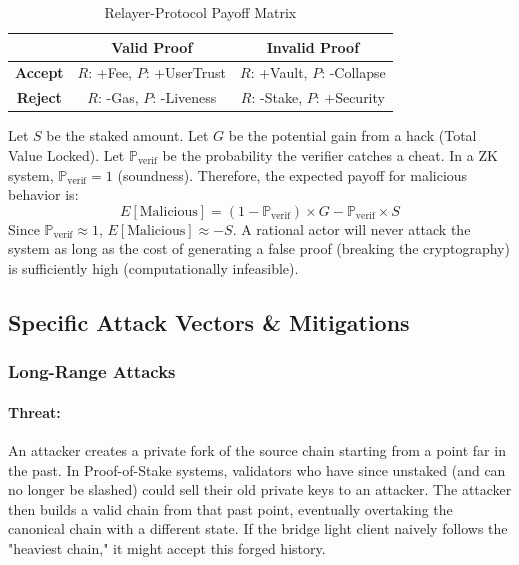 \documentclass[11pt,a4paper]{article}
\begin{document}
\begin{table}[H]
\centering
\begin{tabular}{c|c|c}
 & \textbf{Valid Proof} & \textbf{Invalid Proof} \\ \hline
\textbf{Accept} & $R$: +Fee, $P$: +UserTrust & $R$: +Vault, $P$: -Collapse \\ \hline
\textbf{Reject} & $R$: -Gas, $P$: -Liveness & $R$: -Stake, $P$: +Security \\ \hline
\end{tabular}
\caption{Relayer-Protocol Payoff Matrix}
\end{table}

Let $S$ be the staked amount. Let $G$ be the potential gain from a hack (Total Value Locked). Let $\mathbb{P}_{\text{verif}}$ be the probability the verifier catches a cheat. In a ZK system, $\mathbb{P}_{\text{verif}} = 1$ (soundness).
Therefore, the expected payoff for malicious behavior is:
$$ E[\text{Malicious}] = (1 - \mathbb{P}_{\text{verif}}) \times G - \mathbb{P}_{\text{verif}} \times S $$
Since $\mathbb{P}_{\text{verif}} \approx 1$, $E[\text{Malicious}] \approx -S$.
A rational actor will never attack the system as long as the cost of generating a false proof (breaking the cryptography) is sufficiently high (computationally infeasible).

\subsection{Specific Attack Vectors \& Mitigations}

\subsubsection{Long-Range Attacks}
\paragraph{Threat:} 
An attacker creates a private fork of the source chain starting from a point far in the past. In Proof-of-Stake systems, validators who have since unstaked (and can no longer be slashed) could sell their old private keys to an attacker. The attacker then builds a valid chain from that past point, eventually overtaking the canonical chain with a different state. If the bridge light client naively follows the "heaviest chain," it might accept this forged history.
\end{document}
